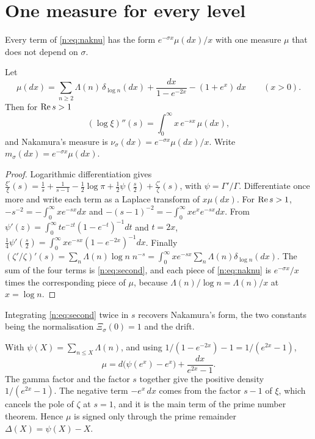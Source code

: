 \section{One measure for every level}\label{n:sec:oneline}

Every term of \eqref{n:eq:naknu} has the form $e^{-\sigma x}\mu(dx)/x$ with one measure $\mu$ that does not depend on $\sigma$.

\begin{proposition}[proved]\label{n:prop:oneline}
Let
\begin{equation}\label{n:eq:mu}
\mu(dx)=\sum_{n\ge2}\Lambda(n)\,\delta_{\log n}(dx)+\frac{dx}{1-e^{-2x}}-(1+e^x)\,dx\qquad(x>0).
\end{equation}
Then for $\operatorname{Re} s>1$
\begin{equation}\label{n:eq:second}
(\log\xi)''(s)=\int_0^\infty x\,e^{-sx}\,\mu(dx),
\end{equation}
and Nakamura's measure is $\nu_\sigma(dx)=e^{-\sigma x}\mu(dx)/x$. Write $m_\sigma(dx)=e^{-\sigma x}\mu(dx)$.
\end{proposition}

\begin{proof}
Logarithmic differentiation gives $\frac{\xi'}\xi(s)=\frac1s+\frac1{s-1}-\frac12\log\pi+\frac12\psi(\frac s2)+\frac{\zeta'}{\zeta}(s)$, with $\psi=\Gamma'/\Gamma$. Differentiate once more and write each term as a Laplace transform of $x\mu(dx)$. For $\operatorname{Re} s>1$, $-s^{-2}=-\int_0^\infty xe^{-sx}dx$ and $-(s-1)^{-2}=-\int_0^\infty xe^xe^{-sx}dx$. From $\psi'(z)=\int_0^\infty te^{-zt}(1-e^{-t})^{-1}dt$ and $t=2x$, $\frac14\psi'(\frac s2)=\int_0^\infty xe^{-sx}(1-e^{-2x})^{-1}dx$. Finally $(\zeta'/\zeta)'(s)=\sum_n\Lambda(n)\log n\;n^{-s}=\int_0^\infty xe^{-sx}\sum_n\Lambda(n)\delta_{\log n}(dx)$. The sum of the four terms is \eqref{n:eq:second}, and each piece of \eqref{n:eq:naknu} is $e^{-\sigma x}/x$ times the corresponding piece of $\mu$, because $\Lambda(n)/\log n=\Lambda(n)/x$ at $x=\log n$.
\end{proof}

Integrating \eqref{n:eq:second} twice in $s$ recovers Nakamura's form, the two constants being the normalisation $\Xi_\sigma(0)=1$ and the drift.

\begin{corollary}[proved]\label{n:cor:sign}
With $\psi(X)=\sum_{n\le X}\Lambda(n)$, and using $1/(1-e^{-2x})-1=1/(e^{2x}-1)$,
\begin{equation}\label{n:eq:split}
\mu=d\big(\psi(e^x)-e^x\big)+\frac{dx}{e^{2x}-1}.
\end{equation}
The gamma factor and the factor $s$ together give the positive density $1/(e^{2x}-1)$. The negative term $-e^x\,dx$ comes from the factor $s-1$ of $\xi$, which cancels the pole of $\zeta$ at $s=1$, and it is the main term of the prime number theorem. Hence $\mu$ is signed only through the prime remainder $\Delta(X)=\psi(X)-X$.
\end{corollary}

